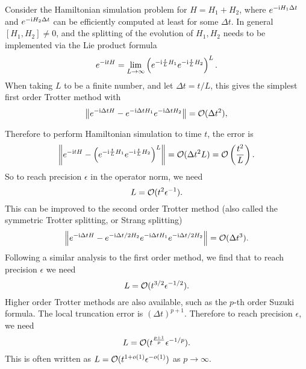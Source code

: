 Consider the Hamiltonian simulation problem for $H=H_1+H_2$, where $e^{-\mathrm{i} H_1 \Delta t}$ and $e^{-\mathrm{i} H_2 \Delta t}$ can be efficiently computed at least for some $\Delta t$.
In general $[H_1,H_2]\ne 0$, and the splitting of the evolution of $H_1,H_2$  needs to be implemented via the Lie product formula
\begin{equation}
 e^{-\mathrm{i} t H}=\lim_{L\to \infty}\left(e^{-\mathrm{i} \frac{t}{L} H_1}e^{-\mathrm{i} \frac{t}{L} H_2}\right)^L.
\end{equation}
When taking $L$ to be a finite number, and let $\Delta t=t/L$, this gives the simplest first order Trotter method with
\begin{equation}
\left\lVert e^{-\mathrm{i} \Delta t H}-e^{-\mathrm{i} \Delta t H_1}e^{-\mathrm{i} \Delta t H_2}\right\rVert=\mathcal{O}(\Delta t^2),
\label{eqn:trotter_coarse_error}
\end{equation}
 
Therefore to perform Hamiltonian simulation to time $t$, the error is 
\begin{equation}
\left\lVert e^{-\mathrm{i} t H}-\left(e^{-\mathrm{i} \frac{t}{L} H_1}e^{-\mathrm{i} \frac{t}{L} H_2}\right)^L\right\rVert=\mathcal{O}(\Delta t^2 L)=\mathcal{O}\left(\frac{t^2}{L}\right).
\end{equation}
So to reach precision $\epsilon$ in the operator norm,  we need 
\begin{equation}
L=\mathcal{O}(t^2 \epsilon^{-1}).
\end{equation}
This can be improved to the second order Trotter method (also called the symmetric Trotter splitting, or Strang splitting) 
\begin{equation}
\left\lVert e^{-\mathrm{i} \Delta t H}-e^{-\mathrm{i} \Delta t/2 H_2}e^{-\mathrm{i} \Delta t H_1}e^{-\mathrm{i} \Delta t/2 H_2}\right\rVert=\mathcal{O}(\Delta t^3).
\end{equation}
Following a similar analysis to the first order method, we find that to reach precision $\epsilon$ we need 
\begin{equation}
L=\mathcal{O}(t^{3/2}\epsilon^{-1/2}).
\end{equation}
Higher order Trotter methods are also available, such as the $p$-th order Suzuki formula.
The local truncation error is $(\Delta t)^{p+1}$. 
Therefore to reach precision $\epsilon$, we need
\begin{equation}
L=\mathcal{O}(t^{\frac{p+1}{p}}\epsilon^{-1/p}).
\end{equation}
This is often written as $L=\mathcal{O}(t^{1+o(1)}\epsilon^{-o(1)})$ as $p\to \infty$.

 

